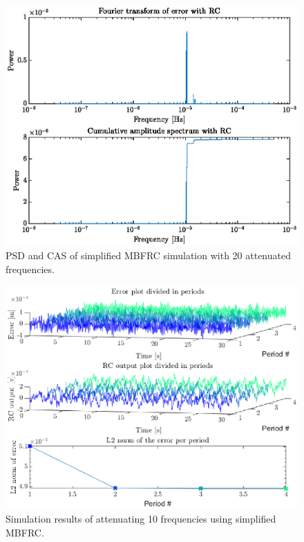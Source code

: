 \documentclass[journal]{IEEEtran}
\begin{document}
\begin{figure}
    \centering
    \includegraphics[width=1\linewidth]{figures/simple_MBFRC/FourierSimp20.eps}
    \caption{PSD and CAS of simplified MBFRC simulation with 20 attenuated frequencies.}
    \label{fig:fftSimp20}
\end{figure}
\begin{figure}
    \centering
    \includegraphics[width=1\linewidth]{figures/simple_MBFRC/SimulationSimp10.eps}
    \caption{Simulation results of attenuating 10 frequencies using simplified MBFRC.}
    \label{fig:SimSimp10}
\end{figure}
\end{document}

